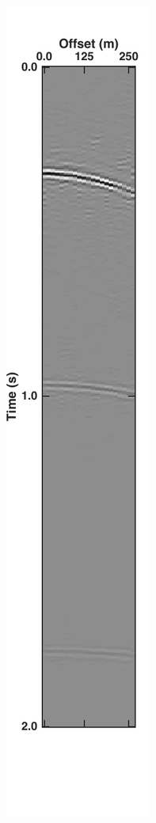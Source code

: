 \begin{figure}
\begin{subfigure}[t]{0.24\textwidth}
		\caption{}
		\label{fig:Ch-Results-Debl-xline10-x}
	\end{subfigure}
	\centering
	\begin{subfigure}[t]{0.24\textwidth}
		\centering
		\includegraphics[height = 0.38\textheight]{Plots/BlendingPatterns/Deblended_xline10t}

\end{subfigure}
\end{figure}
